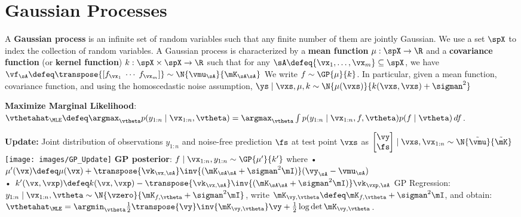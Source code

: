 \section{Gaussian Processes}
\begin{framed}
    A \textbf{Gaussian process} is an infinite set of random variables such that any finite number of them are jointly Gaussian. We use a set $\spX$ to index the collection of random variables.
    A Gaussian process is characterized by a \textbf{mean function} $\mu : \spX \to \R$ and a \textbf{covariance function} (or \textbf{kernel function}) $k : \spX \times \spX \to \R$ such that for any $\sA \defeq \{\vx_1, \dots, \vx_m\} \subseteq \spX$, we have 
  $\vf_\sA \defeq \transpose{[f_{\vx_1} \; \cdots \; f_{\vx_m}]} \sim \N{\vmu_\sA}{\mK_{\sA\sA}}$ 
We write $f \sim \GP{\mu}{k}$.
In particular, given a mean function, covariance function, and using the homoscedastic noise assumption, 
  $\ys \mid \vxs, \mu, k \sim \N{\mu(\vxs)}{k(\vxs, \vxs) + \sigman^2}$
\end{framed}
\begin{framed}
    \textbf{Maximize Marginal Likelihood}: \\
    $ \vthetahat_\MLE \defeq \argmax_{\vtheta} p(y_{1:n} \mid \vx_{1:n}, \vtheta) \\= \argmax_{\vtheta} \int p(y_{1:n} \mid \vx_{1:n}, f, \vtheta) p(f \mid \vtheta) \,d f$.
\end{framed}
\textbf{Update:} Joint distribution of observations $y_{1:n}$ and noise-free prediction $\fs$ at test point $\vxs$ as $\begin{bmatrix}
    \vy \\
    \fs \\
  \end{bmatrix} \mid \vxs, \vx_{1:n} \sim \N{\Tilde{\vmu}}{\Tilde{\mK}}$ \\
\texttt{[image: images/GP\_Update]}
\textbf{GP posterior}: 
$f \mid \vx_{1:n}, y_{1:n} \sim \GP{\mu'}{k'}$ where 
• $ \mu'(\vx) \defeq \mu(\vx) + \transpose{\vk_{\vx,\sA}} \inv{(\mK_{\sA\sA} + \sigman^2 \mI)} (\vy_\sA - \vmu_\sA)$ \\
• $ k'(\vx, \vxp) \defeq k(\vx, \vxp) - \transpose{\vk_{\vx,\sA}} \inv{(\mK_{\sA\sA} + \sigman^2 \mI)} \vk_{\vxp,\sA}$
GP Regression: $y_{1:n} \mid \vx_{1:n}, \vtheta \sim \N{\vzero}{\mK_{f,\vtheta} + \sigman^2 \mI}$, write $\mK_{\vy,\vtheta} \defeq \mK_{f,\vtheta} + \sigman^2 \mI$, and obtain: $\vthetahat_\MLE = \argmin_{\vtheta} \frac{1}{2} \transpose{\vy} \inv{\mK_{\vy,\vtheta}} \vy + \frac{1}{2} \log \det{\mK_{\vy,\vtheta}}$.
